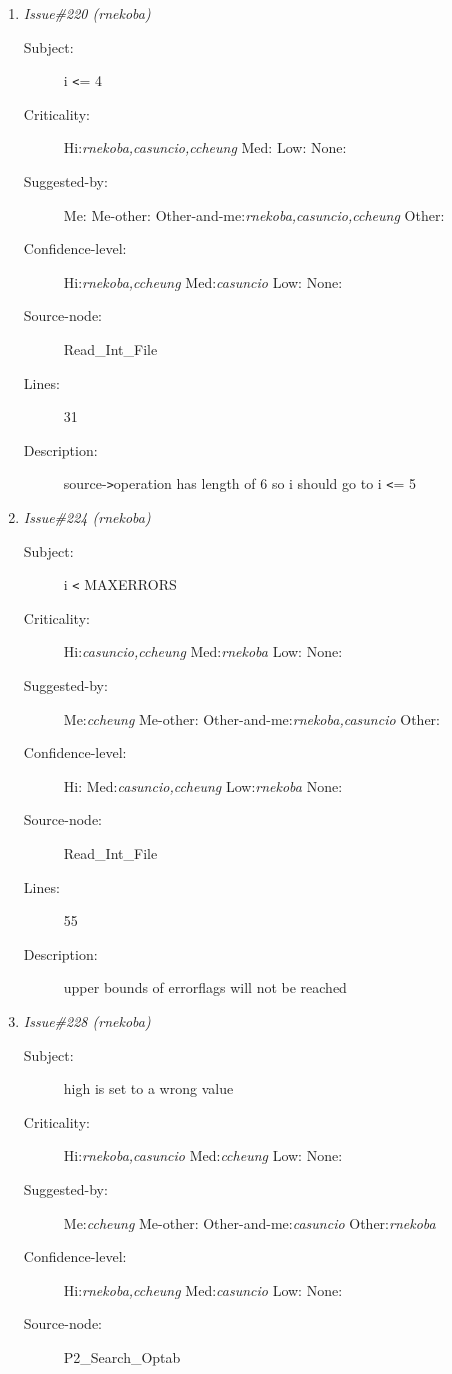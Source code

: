 \begin{enumerate}
\begin{description}
\item [Lines:] 25

\item [Description:] last slot of errorflags will be excluded
\end{description}
\item {\it Issue\#220 (rnekoba)}
\begin{description}
\item [Subject:] i {\tt <}= 4
\item [Criticality:] Hi:{\it rnekoba,casuncio,ccheung} Med:{\it } Low:{\it } None:{\it }
\item [Suggested-by:] Me:{\it } Me-other:{\it } Other-and-me:{\it rnekoba,casuncio,ccheung} Other:{\it }
\item [Confidence-level:] Hi:{\it rnekoba,ccheung} Med:{\it casuncio} Low:{\it } None:{\it }
\item [Source-node:] Read\_Int\_File

\item [Lines:] 31

\item [Description:] source-{\tt >}operation has length of 6 so i should
go to i {\tt <}= 5
\end{description}
\item {\it Issue\#224 (rnekoba)}
\begin{description}
\item [Subject:] i {\tt <} MAXERRORS
\item [Criticality:] Hi:{\it casuncio,ccheung} Med:{\it rnekoba} Low:{\it } None:{\it }
\item [Suggested-by:] Me:{\it ccheung} Me-other:{\it } Other-and-me:{\it rnekoba,casuncio} Other:{\it }
\item [Confidence-level:] Hi:{\it } Med:{\it casuncio,ccheung} Low:{\it rnekoba} None:{\it }
\item [Source-node:] Read\_Int\_File

\item [Lines:] 55

\item [Description:] upper bounds of errorflags will not be reached
\end{description}
\item {\it Issue\#228 (rnekoba)}
\begin{description}
\item [Subject:] high is set to a wrong value
\item [Criticality:] Hi:{\it rnekoba,casuncio} Med:{\it ccheung} Low:{\it } None:{\it }
\item [Suggested-by:] Me:{\it ccheung} Me-other:{\it } Other-and-me:{\it casuncio} Other:{\it rnekoba}
\item [Confidence-level:] Hi:{\it rnekoba,ccheung} Med:{\it casuncio} Low:{\it } None:{\it }
\item [Source-node:] P2\_Search\_Optab


\end{description}
\end{enumerate}
